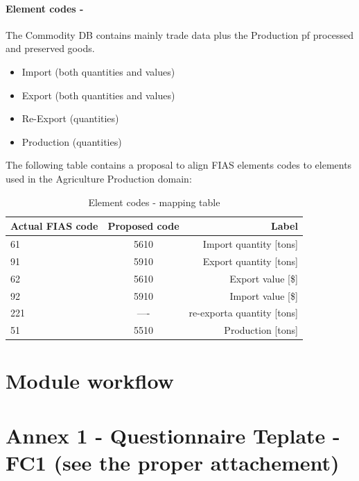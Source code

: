 \documentclass[nojss]{jss}
\begin{document}
\paragraph{Element codes -} The Commodity DB contains mainly trade data plus the Production pf processed and preserved goods.
\begin{itemize}
\item Import (both quantities and values)
\item Export (both quantities and values)
\item Re-Export (quantities)
\item Production (quantities)
\end{itemize}


The following table contains a proposal to align FIAS elements codes to elements used in the Agriculture Production domain:

\begin{table}[h!]
  \begin{center}
    \caption{Element codes - mapping table}
    \label{tab:table1}
    \begin{tabular}{l|c|r} %
      \textbf{Actual FIAS  code} & \textbf{Proposed code} & \textbf{Label} \\
      \hline
      61  & 5610 & Import quantity [tons]\\
      91  & 5910 & Export quantity [tons]\\
      62  & 5610 & Export value [\$]\\
      92  & 5910 & Import value [\$] \\
      221 & ---- & re-exporta quantity [tons]\\
      51 & 5510 & Production [tons] \\
    \end{tabular}
  \end{center}
\end{table}

\section{Module workflow}



\section{Annex 1 - Questionnaire Teplate - FC1 (see the proper attachement) }
\end{document}
